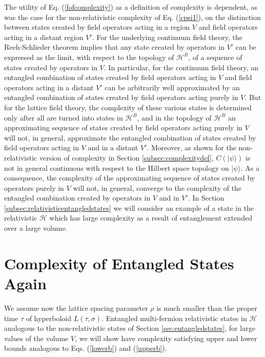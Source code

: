 \documentclass[12pt,amsmath,amssymb,onecolumn]{revtex4-2}
\begin{document}
The utility of Eq. (\ref{fofcomplexity}) as a definition of complexity is
dependent, as was the case for the
non-relativistic complexity of Eq. (\ref{cpsi1}), on the distinction
between states created by field operators acting in a region $V$ and field
operators acting in a distant region $V'$.
For the underlying continuum field theory,
the Reeh-Schlieder theorem implies that any state created by operators
in $V'$ can be expressed as the limit, with respect to the
topology of $\mathcal{H}^R$, of a sequence of states created
by operators in $V$.
In particular, for the continuum
field theory, an entangled combination of states created by field operators
acting in $V$ and field operators acting in a distant $V'$
can be arbitrarily well approximated by an entangled
combination of states created by field operators acting purely in $V$.
But for the lattice field theory, the complexity of these various states
is determined only after all are turned into states in $\mathcal{H}^B$,
and in the topology of $\mathcal{H}^B$ an approximating sequence
of states created by field operators acting purely in $V$
will not, in general,  approximate the entangled combination of
states created by field operators
acting in $V$ and in a distant $V'$.
Moreover, as shown for the
non-relativistic version of complexity in Section \ref{subsec:complexitydef},
$C( |\psi \rangle )$ is not in general continuous with respect to
the Hilbert space topology on $|\psi \rangle $.
As a consequence, the complexity of the approximating
sequence of states created by operators purely in $V$
will not, in general, converge to the complexity
of the entangled combination created by operators
in $V$ and in $V'$.
In Section \ref{subsec:relativisticentangledstates}
we will consider an example of a state in the relativistic $\mathcal{H}$
which has large complexity as a result of entanglement extended over a large volume.


\section{\label{subsec:relativisticentangledstates} Complexity of Entangled States Again }

We assume now the lattice spacing parameter $\rho$ is much smaller than the proper time
$\tau$ of hyperboloid $L(\tau, \sigma)$.
Entangled multi-fermion relativistic states in $\mathcal{H}$
analogous to the non-relativistic states of Section \ref{sec:entangledstates},
for large values of the volume $V$, we will show
have complexity satisfying upper and lower bounds analogous to Eqs. (\ref{lowerb}) and (\ref{upperb}).
\end{document}
